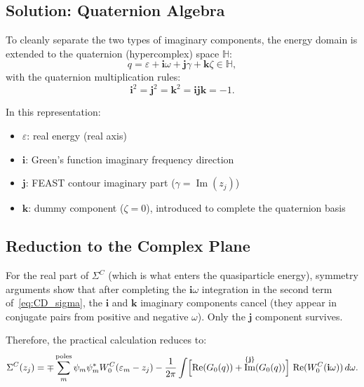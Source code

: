 \documentclass[12pt,a4paper]{article}
\theoremstyle{definition}
\DeclareMathOperator{\ReOp}{Re}
\DeclareMathOperator{\ImOp}{Im}
\begin{document}
\subsection{Solution: Quaternion Algebra}

To cleanly separate the two types of imaginary components, the energy domain is extended to the quaternion (hypercomplex) space $\mathbb{H}$:
\begin{equation}\label{eq:quaternion}
\boxed{q = \varepsilon + \mathbf{i}\omega + \mathbf{j}\gamma + \mathbf{k}\zeta \in \mathbb{H}},
\end{equation}
with the quaternion multiplication rules:
\begin{equation}
\mathbf{i}^2 = \mathbf{j}^2 = \mathbf{k}^2 = \mathbf{i}\mathbf{j}\mathbf{k} = -1.
\end{equation}

In this representation:
\begin{itemize}
    \item $\varepsilon$: real energy (real axis)
    \item $\mathbf{i}$: Green's function imaginary frequency direction
    \item $\mathbf{j}$: FEAST contour imaginary part ($\gamma = \ImOp(z_j)$)
    \item $\mathbf{k}$: dummy component ($\zeta = 0$), introduced to complete the quaternion basis
\end{itemize}

\subsection{Reduction to the Complex Plane}

For the real part of $\Sigma^{C}$ (which is what enters the quasiparticle energy), symmetry arguments show that after completing the $\mathbf{i}\omega$ integration in the second term of~\eqref{eq:CD_sigma}, the $\mathbf{i}$ and $\mathbf{k}$ imaginary components cancel (they appear in conjugate pairs from positive and negative $\omega$). Only the $\mathbf{j}$ component survives.

Therefore, the practical calculation reduces to:
\begin{equation}\label{eq:reduced_sigma}
\Sigma^{C}(z_j) = \mp\sum_{m}^{\text{poles}} \psi_m\psi_m^{*} W_0^{C}(\varepsilon_m - z_j)
- \frac{1}{2\pi} \int \Bigl[\ReOp(G_0(q)) + \ImOp^{\{\mathbf{j}\}}(G_0(q))\Bigr]\,\ReOp(W_0^{C}(\mathbf{i}\omega))\,d\omega.
\end{equation}
\end{document}
